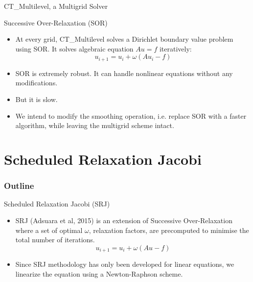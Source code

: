 \documentclass{beamer}
\begin{document}
\begin{frame}{CT\_Multilevel, a Multigrid Solver}
\end{frame}

\begin{frame}{Successive Over-Relaxation (SOR)}

\begin{itemize}
    \item At every grid, CT\_Multilevel solves a Dirichlet boundary value problem using SOR. It solves algebraic equation $Au=f$ iteratively:
    $$u_{i+1}=u_i+\omega(Au_i-f)$$
    \item SOR is extremely robust. It can handle nonlinear equations without any modifications.
    \item But it is slow.
    \item We intend to modify the smoothing operation, i.e. replace SOR with  a faster algorithm, while leaving the multigrid scheme intact.
\end{itemize}
\end{frame}

\section{Scheduled Relaxation Jacobi}
\begin{frame}
\frametitle{Outline}
  \tableofcontents[currentsection]
\end{frame}

\begin{frame}{Scheduled Relaxation Jacobi (SRJ)}
\begin{itemize}
    \item SRJ (Adsuara et al, 2015) is an extension of Successive Over-Relaxation where a set of optimal $\omega$, relaxation factors, are precomputed to minimise the total number of iterations.
    $$u_{i+1} = u_i+\omega(Au-f)$$
    \item Since SRJ methodology has only been developed for linear equations, we linearize the equation using a Newton-Raphson scheme.
\end{itemize}

\end{frame}
\end{document}
